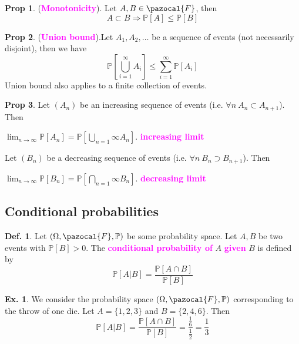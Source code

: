 \documentclass[8pt,a4paper,landscape]{article}
\theoremstyle{definition}
\newtheorem{definition}{Def.}[section]
\theoremstyle{example}
\newtheorem{example}{Ex.}[section]
\theoremstyle{intuition}
\theoremstyle{definition}
\newtheorem{proposition}{Prop}[section]
\newcommand{\Fb}{\pazocal{F}}
\newcommand{\mydef}[1]{\textcolor{magenta}{\textbf{#1}}}
\newcommand{\prob}[1]{\mathbb{P}\left[ #1 \right]}
\begin{document}
\begin{multicols}{3}
				\begin{proposition}
					(\mydef{Monotonicity}). Let $A, B \in \Fb$, then
					$$
						A \subset B \Rightarrow \prob{A} \leq \prob{B}
					$$
				\end{proposition}
				
				\begin{proposition}
					(\mydef{Union bound}).Let $A_1, A_2, \ldots$ be a sequence of events (not necessarily disjoint), then we have
					$$
						\prob{\bigcup\limits_{i=1}^{\infty} A_i} \leq \sum_{i=1}^{\infty}\prob{A_i}
					$$
					Union bound also applies to a finite collection of events.
				\end{proposition}
				
				\begin{proposition}
					Let $(A_n)$ be an increasing sequence of events (i.e. $\forall n \ A_n \subset A_{n+1}$). Then
					\begin{center}
						$\lim_{n \rightarrow \infty} \prob{A_n} = \prob{\bigcup\limits_{n=1}{\infty} A_n}$. \mydef{increasing limit}
					\end{center}
					Let $(B_n)$ be a decreasing sequence of events (i.e. $\forall n \ B_n \supset B_{n+1}$). Then
					\begin{center}
						$\lim_{n \rightarrow \infty} \prob{B_n} = \prob{\bigcap\limits_{n=1}{\infty} B_n}$. \mydef{decreasing limit}
					\end{center}
				\end{proposition}
				
				
			\subsection{Conditional probabilities}
			
				\begin{definition}
					Let $(\Omega, \Fb, \mathbb{P})$ be some probability space. Let $A, B$ be two events with $\prob{B} > 0$. The \mydef{conditional probability of} $A$ \mydef{given} $B$ is defined by
					$$
						\prob{A \lvert B} = \frac{\prob{A \cap B}}{\prob{B}}
					$$
				\end{definition}
				
				\begin{example}
					We consider the probability space $(\Omega, \Fb, \mathbb{P})$ corresponding to the throw of one die. Let $A = \{1,2,3\}$ and $B = \{2,4,6\}$. Then
					$$
						\prob{A \lvert B} = \frac{\prob{A \cap B}}{\prob{B}} = \frac{\frac{1}{6}}{\frac{1}{2}} = \frac{1}{3}
					$$
				\end{example}
				

\end{multicols}
\end{document}
